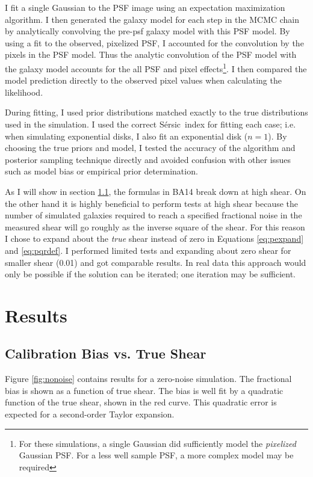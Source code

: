 \documentclass[12pt,preprint]{aastex}
\newcommand{\sersic}{S\'{e}rsic}
\begin{document}
I fit a single Gaussian to the PSF image using an expectation maximization
algorithm. I then generated the galaxy model for each step in the MCMC chain by
analytically convolving the pre-psf galaxy model with this PSF model.  By using
a fit to the observed, pixelized PSF, I accounted for the convolution by the
pixels in the PSF model.  Thus the analytic convolution of the PSF model with
the galaxy model accounts for the all PSF and pixel effects\footnote{For these
    simulations, a single Gaussian did sufficiently model the {\it pixelized}
Gaussian PSF. For a less well sample PSF, a more complex model may be
required}.  I then compared the model prediction directly to the observed pixel
values when calculating the likelihood.


During fitting, I used prior distributions matched exactly to the true
distributions used in the simulation.  I used the correct \sersic\ index for
fitting each case; i.e. when simulating exponential disks, I also fit an
exponential disk ($n=1$).  By choosing the true priors and model, I tested the
accuracy of the algorithm and posterior sampling technique directly and avoided
confusion with other issues such as model bias or empirical prior
determination.

As I will show in section \ref{sec:truebias}, the formulas in BA14 break down
at high shear.  On the other hand it is highly beneficial to perform tests at
high shear because the number of simulated galaxies required to reach a
specified fractional noise in the measured shear will go roughly as the inverse
square of the shear.  For this reason I chose to expand about the {\it true}
shear instead of zero in Equations \ref{eq:pexpand} and \ref{eq:pqrdef}.  I
performed limited tests and expanding about zero shear for smaller shear (0.01)
and got comparable results. In real data this approach would only be possible
if the solution can be iterated; one iteration may be sufficient.

\section{Results} \label{sec:results}

\subsection{Calibration Bias vs. True Shear} \label{sec:truebias}

Figure \ref{fig:nonoise} contains results for a zero-noise simulation.  The
fractional bias is shown as a function of true shear.  The bias is well fit by
a quadratic function of the true shear, shown in the red curve. This quadratic
error is expected for a second-order Taylor expansion.
\end{document}
